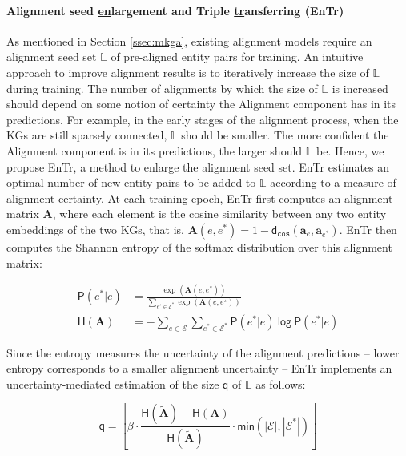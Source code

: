 \documentclass[11pt]{article}
\begin{document}
\paragraph{Alignment seed \underline{en}largement and Triple \underline{tr}ansferring (EnTr)} As mentioned in Section \ref{ssec:mkga}, existing alignment models require an alignment seed set $\mathbb{L}$ of pre-aligned entity pairs for training. An intuitive approach to improve alignment results is to iteratively increase the size of $\mathbb{L}$ during training. The number of alignments by which the size of $\mathbb{L}$ is increased should depend on some notion of certainty the Alignment component has in its predictions. For example, in the early stages of the alignment process, when the KGs are still sparsely connected, $\mathbb{L}$ should be smaller. The more confident the Alignment component is in its predictions, the larger should $\mathbb{L}$ be.  
Hence, we propose EnTr, a method to enlarge the  alignment seed set. EnTr estimates an optimal number of new entity pairs to be added to $\mathbb{L}$ according to a measure of alignment certainty. At each training epoch, EnTr first computes an alignment matrix $\mathbf{A}$, where each element is the cosine similarity between any two entity embeddings of the two KGs, that is, $\mathbf{A}(e, e^*) = 1 - \mathsf{d}_{\mathtt{cos}}({{\mathbf{a}_e}}, {\mathbf{a}_{e^*}})$. EnTr then computes the Shannon entropy of the softmax distribution over this alignment matrix:

\begin{align}
   \mathsf{P}(e^*|e) &= \frac{\exp\left(\mathbf{A}(e, e^*)\right)
    }{\sum_{e^\star \in \mathcal{E}^*} \exp\left(\mathbf{A}(e, e^\star)\right)} \\
   \mathsf{H}(\mathbf{A}) &= -\sum_{e \in \mathcal{E}} \sum_{e^* \in \mathcal{E}^*} \mathsf{P}(e^*|e)\ \mathsf{log}\ \mathsf{P}(e^*|e)
\end{align}

Since the entropy measures the uncertainty of the alignment predictions -- lower entropy corresponds to a smaller alignment uncertainty -- EnTr implements an uncertainty-mediated estimation of the size $\mathsf{q}$ of $\mathbb{L}$ as follows: 

\begin{equation}
    \mathsf{q} = \left\lfloor \beta \cdot  \frac{\mathsf{H}(\mathbf{\widetilde A}) - \mathsf{H}(\mathbf{A})}{\mathsf{H}(\mathbf{\widetilde A})} \cdot \mathsf{min}(|\mathcal{E}|, |\mathcal{E}^*|) \right\rfloor
    \label{eqn:num_sample}
\end{equation}
\end{document}
